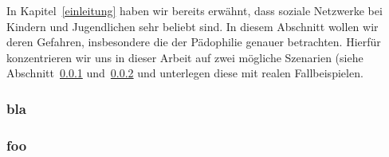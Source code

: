 In Kapitel~\ref{einleitung} haben wir bereits erw\"ahnt, dass soziale Netzwerke
bei Kindern und Jugendlichen sehr beliebt sind. In diesem Abschnitt wollen wir
deren Gefahren, insbesondere die der P\"adophilie genauer betrachten. Hierf\"ur
konzentrieren wir uns in dieser Arbeit auf zwei m\"ogliche Szenarien (siehe
Abschnitt~\ref{gefahren:kinder:informationen} und~\ref{gefahren:kinder:treffen} und
unterlegen diese mit realen Fallbeispielen.

\subsubsection{bla}
\label{gefahren:kinder:informationen}

\subsubsection{foo}
\label{gefahren:kinder:treffen}
